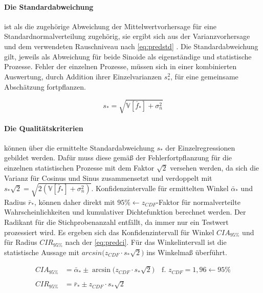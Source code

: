 \clearpage


\paragraph*{Die Standardabweichung} ist als die zugehörige Abweichung der Mittelwertvorhersage für eine Standardnormalverteilung zugehörig, sie ergibt sich aus der Varianzvorhersage und dem verwendeten Rauschniveau nach \autoref{eq:predstd} \cite{Rasmussen2006}. Die Standardabweichung gilt, jeweils als Abweichung für beide Sinoide als eigenständige und statistische Prozesse. Fehler der einzelnen Prozesse, müssen sich in einer kombinierten Auswertung, durch Addition ihrer Einzelvarianzen $s_*^2$, für eine gemeinsame Abschätzung fortpflanzen.


\begin{equation}\label{eq:predstd}
s_* = \sqrt{\mathbb{V}\left[ \bar{f}_* \right] + \sigma_n^2}
\end{equation}


\paragraph*{Die Qualitätskriterien} können über die ermittelte Standardabweichung $s_*$ der Einzelregressionen gebildet werden. Dafür muss diese gemäß der Fehlerfortpflanzung für die einzelnen statistischen Prozesse mit dem Faktor $\sqrt{2}$ versehen werden, da sich die Varianz für Cosinus und Sinus zusammensetzt und verdoppelt mit $s_* \sqrt{2} = \sqrt{2(\mathbb{V}\left[ \bar{f}_* \right] + \sigma_n^2)}$. Konfidenzintervalle für ermittelten Winkel $\bar{\alpha}_*$ und Radius $\bar{r}_*$, können daher direkt mit $95\% \leftarrow z_{CDF}$-Faktor für normalverteilte Wahrscheinlichkeiten und kumulativer Dichtefunktion berechnet werden. Der Radikant für die Stichprobenanzahl entfällt, da immer nur ein Testwert prozessiert wird. Es ergeben sich das Konfidenzintervall für Winkel $CIA_{95\%}$ und für Radius $CIR_{95\%}$ nach der \autoref{eq:predci}. Für das Winkelintervall ist die statistische Aussage mit $arcsin \big( z_{CDF} \cdot s_* \sqrt{2} \big)$ ins Winkelmaß überführt.


\begin{align}\label{eq:predci}
	CIA_{95\%} &= \bar{\alpha}_* \pm \arcsin \big( z_{CDF} \cdot s_* \sqrt{2} \big) \quad \text{f. } z_{CDF} = 1,96 \leftarrow 95\% \nonumber \\
	\\
	CIR_{95\%} &= \bar{r}_* \pm z_{CDF} \cdot s_* \sqrt{2} \nonumber
\end{align}



